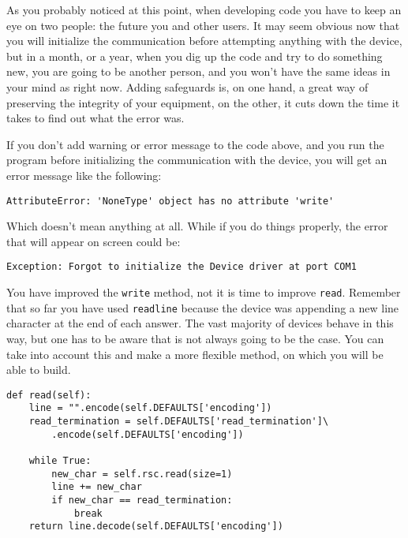 
As you probably noticed at this point, when developing code you have to
keep an eye on two people: the future you and other users. It may seem
obvious now that you will initialize the communication before attempting
anything with the device, but in a month, or a year, when you dig up the
code and try to do something new, you are going to be another person,
and you won't have the same ideas in your mind as right now. Adding
safeguards is, on one hand, a great way of preserving the integrity of
your equipment, on the other, it cuts down the time it takes to find out
what the error was.

If you don't add warning or error message to the code above, and you run
the program before initializing the communication with the device, you
will get an error message like the following:

\begin{verbatim}
AttributeError: 'NoneType' object has no attribute 'write'
\end{verbatim}

Which doesn't mean anything at all. While if you do things properly, the
error that will appear on screen could be:

\begin{verbatim}
Exception: Forgot to initialize the Device driver at port COM1
\end{verbatim}

You have improved the \texttt{write} method, not it is time to improve
\texttt{read}. Remember that so far you have used \texttt{readline}
because the device was appending a new line character at the end of each
answer. The vast majority of devices behave in this way, but one has to
be aware that is not always going to be the case. You can take into
account this and make a more flexible method, on which you will be able
to build.

\begin{verbatim}
def read(self):
    line = "".encode(self.DEFAULTS['encoding'])
    read_termination = self.DEFAULTS['read_termination']\
        .encode(self.DEFAULTS['encoding'])
    
    while True:
        new_char = self.rsc.read(size=1)
        line += new_char
        if new_char == read_termination:
            break
    return line.decode(self.DEFAULTS['encoding'])
\end{verbatim}

